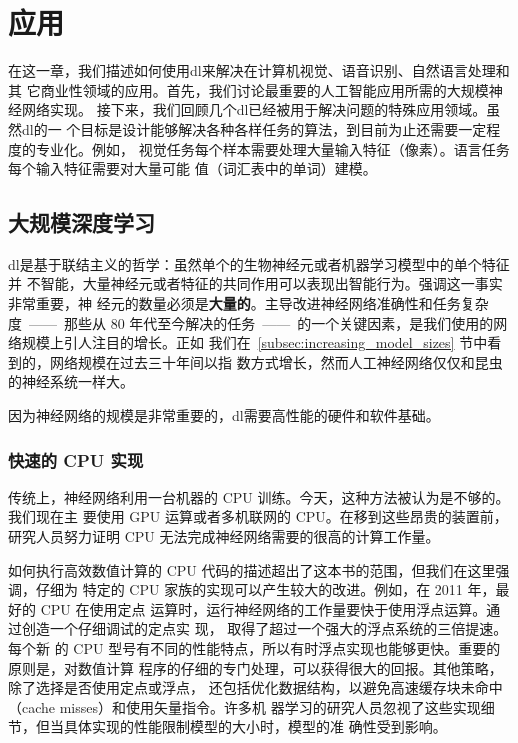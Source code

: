 \chapter{应用}
\label{ch:applications}

在这一章，我们描述如何使用\gls*{dl}来解决在计算机视觉、语音识别、自然语言处理和其
它商业性领域的应用。首先，我们讨论最重要的人工智能应用所需的大规模神经网络实现。
接下来，我们回顾几个\gls*{dl}已经被用于解决问题的特殊应用领域。虽然\gls*{dl}的一
个目标是设计能够解决各种各样任务的算法，到目前为止还需要一定程度的专业化。例如，
视觉任务每个样本需要处理大量输入特征（像素）。语言任务每个输入特征需要对大量可能
值（词汇表中的单词）建模。

\section{大规模深度学习}
\label{sec:large_scale_deep_learning}

\gls*{dl}是基于联结主义的哲学：虽然单个的生物神经元或者机器学习模型中的单个特征并
不智能，大量神经元或者特征的共同作用可以表现出智能行为。强调这一事实非常重要，神
经元的数量必须是\textbf{大量的}。主导改进神经网络准确性和任务复杂度~——~那些从 80
年代至今解决的任务~——~的一个关键因素，是我们使用的网络规模上引人注目的增长。正如
我们在~\ref{subsec:increasing_model_sizes} 节中看到的，网络规模在过去三十年间以指
数方式增长，然而人工神经网络仅仅和昆虫的神经系统一样大。

因为神经网络的规模是非常重要的，\gls*{dl}需要高性能的硬件和软件基础。

\subsection{快速的 CPU 实现}
\label{subsec:fast_cpu_implementations}

传统上，神经网络利用一台机器的 CPU 训练。今天，这种方法被认为是不够的。我们现在主
要使用 GPU 运算或者多机联网的 CPU。在移到这些昂贵的装置前，研究人员努力证明 CPU
无法完成神经网络需要的很高的计算工作量。

如何执行高效数值计算的 CPU 代码的描述超出了这本书的范围，但我们在这里强调，仔细为
特定的 CPU 家族的实现可以产生较大的改进。例如，在 2011 年，最好的 CPU 在使用定点
运算时，运行神经网络的工作量要快于使用浮点运算。通过创造一个仔细调试的定点实
现，\citet{Vanhoucke-et-al-2011} 取得了超过一个强大的浮点系统的三倍提速。每个新
的 CPU 型号有不同的性能特点，所以有时浮点实现也能够更快。重要的原则是，对数值计算
程序的仔细的专门处理，可以获得很大的回报。其他策略，除了选择是否使用定点或浮点，
还包括优化数据结构，以避免高速缓存块未命中（cache misses）和使用矢量指令。许多机
器学习的研究人员忽视了这些实现细节，但当具体实现的性能限制模型的大小时，模型的准
确性受到影响。

